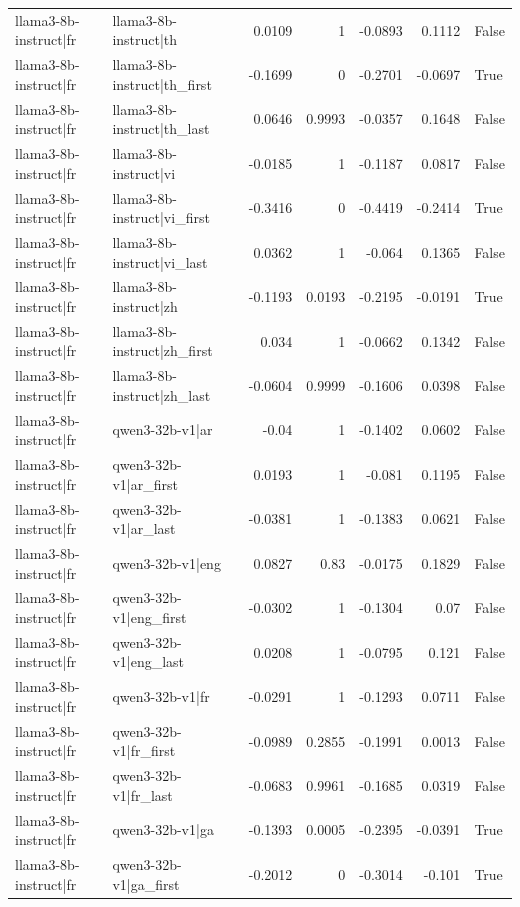 \begin{table}
\begin{tabular}{l l r r r r l}
llama3-8b-instruct|fr & llama3-8b-instruct|th & 0.0109 & 1 & -0.0893 & 0.1112 & False \\
llama3-8b-instruct|fr & llama3-8b-instruct|th_first & -0.1699 & 0 & -0.2701 & -0.0697 & True \\
llama3-8b-instruct|fr & llama3-8b-instruct|th_last & 0.0646 & 0.9993 & -0.0357 & 0.1648 & False \\
llama3-8b-instruct|fr & llama3-8b-instruct|vi & -0.0185 & 1 & -0.1187 & 0.0817 & False \\
llama3-8b-instruct|fr & llama3-8b-instruct|vi_first & -0.3416 & 0 & -0.4419 & -0.2414 & True \\
llama3-8b-instruct|fr & llama3-8b-instruct|vi_last & 0.0362 & 1 & -0.064 & 0.1365 & False \\
llama3-8b-instruct|fr & llama3-8b-instruct|zh & -0.1193 & 0.0193 & -0.2195 & -0.0191 & True \\
llama3-8b-instruct|fr & llama3-8b-instruct|zh_first & 0.034 & 1 & -0.0662 & 0.1342 & False \\
llama3-8b-instruct|fr & llama3-8b-instruct|zh_last & -0.0604 & 0.9999 & -0.1606 & 0.0398 & False \\
llama3-8b-instruct|fr & qwen3-32b-v1|ar & -0.04 & 1 & -0.1402 & 0.0602 & False \\
llama3-8b-instruct|fr & qwen3-32b-v1|ar_first & 0.0193 & 1 & -0.081 & 0.1195 & False \\
llama3-8b-instruct|fr & qwen3-32b-v1|ar_last & -0.0381 & 1 & -0.1383 & 0.0621 & False \\
llama3-8b-instruct|fr & qwen3-32b-v1|eng & 0.0827 & 0.83 & -0.0175 & 0.1829 & False \\
llama3-8b-instruct|fr & qwen3-32b-v1|eng_first & -0.0302 & 1 & -0.1304 & 0.07 & False \\
llama3-8b-instruct|fr & qwen3-32b-v1|eng_last & 0.0208 & 1 & -0.0795 & 0.121 & False \\
llama3-8b-instruct|fr & qwen3-32b-v1|fr & -0.0291 & 1 & -0.1293 & 0.0711 & False \\
llama3-8b-instruct|fr & qwen3-32b-v1|fr_first & -0.0989 & 0.2855 & -0.1991 & 0.0013 & False \\
llama3-8b-instruct|fr & qwen3-32b-v1|fr_last & -0.0683 & 0.9961 & -0.1685 & 0.0319 & False \\
llama3-8b-instruct|fr & qwen3-32b-v1|ga & -0.1393 & 0.0005 & -0.2395 & -0.0391 & True \\
llama3-8b-instruct|fr & qwen3-32b-v1|ga_first & -0.2012 & 0 & -0.3014 & -0.101 & True \\

\end{tabular}
\end{table}
